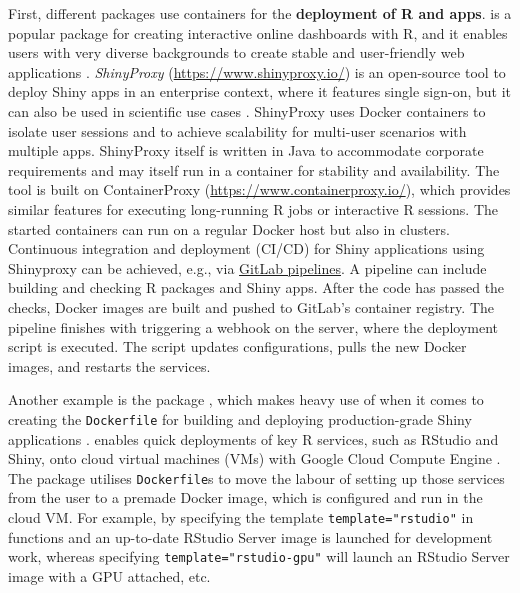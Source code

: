 First, different packages use containers for the \textbf{deployment of R
and  apps}.  is a popular package for creating
interactive online dashboards with R, and it enables users with very
diverse backgrounds to create stable and user-friendly web applications
\citep{cran_shiny}. \emph{ShinyProxy} (\url{https://www.shinyproxy.io/})
is an open-source tool to deploy Shiny apps in an enterprise context,
where it features single sign-on, but it can also be used in scientific
use cases
\citep[e.g., ][]{savini_epiexplorer_2019,glouzon_structurexplor_2017}.
ShinyProxy uses Docker containers to isolate user sessions and to
achieve scalability for multi-user scenarios with multiple apps.
ShinyProxy itself is written in Java to accommodate corporate
requirements and may itself run in a container for stability and
availability. The tool is built on ContainerProxy
(\url{https://www.containerproxy.io/}), which provides similar features
for executing long-running R jobs or interactive R sessions. The started
containers can run on a regular Docker host but also in clusters.
Continuous integration and deployment (CI/CD) for Shiny applications
using Shinyproxy can be achieved, e.g., via
\href{https://docs.gitlab.com/ee/ci/pipelines.html}{GitLab pipelines}. A
pipeline can include building and checking R packages and Shiny apps.
After the code has passed the checks, Docker images are built and pushed
to GitLab's container registry. The pipeline finishes with triggering a
webhook on the server, where the deployment script is executed. The
script updates configurations, pulls the new Docker images, and restarts
the services.

Another example is the package , which makes heavy use of
 when it comes to creating the \texttt{Dockerfile} for
building and deploying production-grade Shiny applications
\citep{cran_golem}.  enables quick
deployments of key R services, such as RStudio and Shiny, onto cloud
virtual machines (VMs) with Google Cloud Compute Engine
\citep{googleComputeEngineR_2019}. The package utilises
\texttt{Dockerfile}s to move the labour of setting up those services
from the user to a premade Docker image, which is configured and run in
the cloud VM. For example, by specifying the template
\texttt{template="rstudio"} in functions  and
 an up-to-date RStudio Server image is launched for
development work, whereas specifying \texttt{template="rstudio-gpu"}
will launch an RStudio Server image with a GPU attached, etc.

